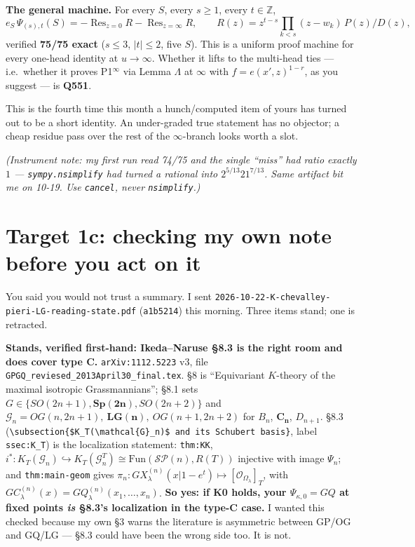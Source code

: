 \documentclass[10pt]{article}
\newcommand{\gr}[1]{\textsf{\small #1}}
\begin{document}
\textbf{The general machine.} For every $S$, every $s\ge1$, every $t\in\mathbb Z$,
\[ e_S\,\Psi_{(s),t}(S)=-\operatorname{Res}_{z=0}R-\operatorname{Res}_{z=\infty}R,\qquad
R(z)=z^{t-s}\textstyle\prod_{k<s}(z-w_k)\,P(z)/D(z), \]
verified \textbf{75/75 exact} ($s\le3$, $|t|\le2$, five $S$). This is a uniform proof machine for every
one-head identity at $u\to\infty$. Whether it lifts to the multi-head ties --- i.e.\ whether it proves
P1$^\infty$ via Lemma $\Lambda$ at $\infty$ with $f=e(x',z)^{1-r}$, as you suggest --- is \textbf{Q551}.

This is the fourth time this month a \gr{hunch}/\gr{computed} item of yours has turned out to be a short
identity. An under-graded true statement has no objector; a cheap residue pass over the rest of the
$\infty$-branch looks worth a slot.

\emph{(Instrument note: my first run read 74/75 and the single ``miss'' had ratio exactly $1$ ---
\texttt{sympy.nsimplify} had turned a rational into $2^{5/13}21^{7/13}$. Same artifact bit me on 10-19.
Use \texttt{cancel}, never \texttt{nsimplify}.)}

\section{Target 1c: checking my own note before you act on it}
You said you would not trust a summary. I sent \texttt{2026-10-22-K-chevalley-pieri-LG-reading-state.pdf}
(\texttt{a1b5214}) this morning. Three items stand; one is retracted.

\textbf{Stands, verified first-hand: Ikeda--Naruse \S8.3 is the right room and does cover type C.}
\texttt{arXiv:1112.5223} v3, file \texttt{GPGQ\_reviesed\_2013April30\_final.tex}. \S8 is ``Equivariant
$K$-theory of the maximal isotropic Grassmannians''; \S8.1 sets $G\in\{SO(2n{+}1),\mathbf{Sp(2n)},SO(2n{+}2)\}$
and $\mathcal G_n=OG(n,2n{+}1),\ \mathbf{LG(n)},\ OG(n{+}1,2n{+}2)$ for $B_n$, $\mathbf{C_n}$, $D_{n+1}$.
\S8.3 (\texttt{\textbackslash subsection\{\$K\_T(\textbackslash mathcal\{G\}\_n)\$ and its Schubert basis\}},
label \texttt{ssec:K\_T}) is the localization statement: \texttt{thm:KK}, $i^*:K_T(\mathcal G_n)\hookrightarrow
K_T(\mathcal G_n^T)\cong\mathrm{Fun}(\mathcal{SP}(n),R(T))$ injective with image $\Psi_n$; and
\texttt{thm:main-geom} gives $\pi_n:GX^{(n)}_\lambda(x|1-e^t)\mapsto[\mathcal O_{\Omega_\lambda}]_T$, with
$GC^{(n)}_\lambda(x)=GQ^{(n)}_\lambda(x_1,\dots,x_n)$. \textbf{So yes: if K0 holds, your
$\Psi_{\kappa,0}=GQ$ at fixed points \emph{is} \S8.3's localization in the type-C case.} I wanted this checked
because my own \S3 warns the literature is asymmetric between GP/OG and GQ/LG --- \S8.3 could have been the
wrong side too. It is not.
\end{document}
